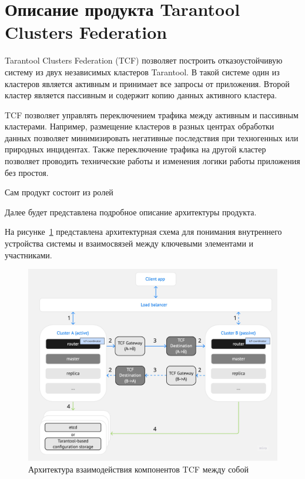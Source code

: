 \section{Описание продукта \flqq Tarantool Clusters Federation\frqq}

Tarantool Clusters Federation (TCF) \cite{tcf} позволяет построить отказоустойчивую систему из двух независимых
кластеров Tarantool. В такой системе один из кластеров является активным и принимает все запросы от
приложения. Второй кластер является пассивным и содержит копию данных активного кластера.

TCF позволяет управлять переключением трафика между активным и пассивным кластерами. Например, размещение
кластеров в разных центрах обработки данных позволяет минимизировать негативные последствия при
техногенных или природных инцидентах. Также переключение трафика на другой кластер позволяет проводить
технические работы и изменения логики работы приложения без простоя.

Сам продукт состоит из ролей 

Далее будет представлена подробное описание архитектуры продукта.

На рисунке~\ref{fig:fig01} представлена архитектурная схема для понимания внутреннего устройства системы и взаимосвязей между
ключевыми элементами и участниками.

\begin{figure}
  \centering
  \includegraphics[scale=0.2]{assets/tcf_architecture.jpg}
  \caption{Архитектура взаимодействия компонентов TCF между собой}
  \label{fig:fig01}
\end{figure}

